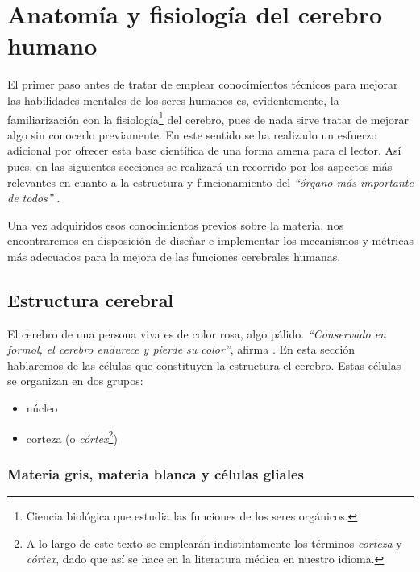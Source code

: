 
\section{Anatomía y fisiología del cerebro humano}
\label{sec::fisiologia}

El primer paso antes de tratar de emplear conocimientos técnicos para mejorar las habilidades mentales de los seres humanos es, evidentemente, la familiarización con la fisiología\footnote{Ciencia biológica que estudia las funciones de los seres orgánicos.} del cerebro, pues de nada sirve tratar de mejorar algo sin conocerlo previamente. En este sentido se ha realizado un esfuerzo adicional por ofrecer esta base científica de una forma amena para el lector. Así pues, en las siguientes secciones se realizará un recorrido por los aspectos más relevantes en cuanto a la estructura y funcionamiento del {\it ``órgano más importante de todos''} \cite{Jacyna2009}.

Una vez adquiridos esos conocimientos previos sobre la materia, nos encontraremos en disposición de diseñar e implementar los mecanismos y métricas más adecuados para la mejora de las funciones cerebrales humanas.

\subsection{Estructura cerebral}

El cerebro de una persona viva es de color rosa, algo pálido. {\it ``Conservado en formol, el cerebro endurece y pierde su color''}, afirma \cite{Czerner2001}. En esta sección hablaremos de las células que constituyen la estructura el cerebro. Estas células se organizan en dos grupos:


\begin{itemize}
\item núcleo
\item corteza (o {\it córtex}\footnote{A lo largo de este texto se emplearán indistintamente los términos \emph{corteza} y \emph{córtex}, dado que así se hace en la literatura médica en nuestro idioma.})
\end{itemize}


\subsubsection{Materia gris, materia blanca y células gliales}

